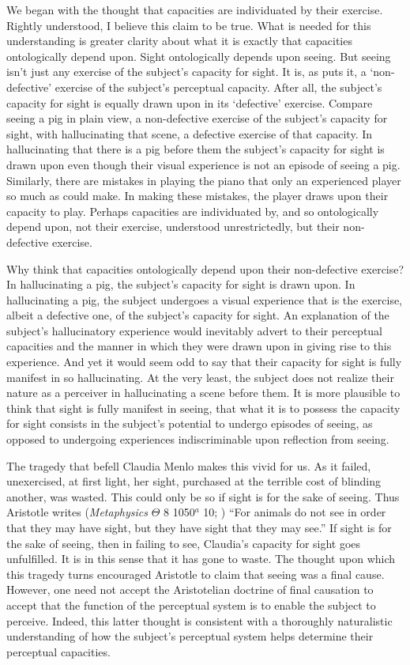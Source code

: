 \documentclass[12pt]{article}
\begin{document}
We began with the thought that capacities are individuated by their exercise. Rightly understood, I believe this claim to be true. What is needed for this understanding is greater clarity about what it is exactly that capacities ontologically depend upon. Sight ontologically depends upon seeing. But seeing isn't just any exercise of the subject's capacity for sight. It is, as \citet{McDowell:2010fk} puts it, a `non-defective' exercise of the subject's perceptual capacity. After all, the subject's capacity for sight is equally drawn upon in its `defective' exercise. Compare seeing a pig in plain view, a non-defective exercise of the subject's capacity for sight, with hallucinating that scene, a defective exercise of that capacity. In hallucinating that there is a pig before them the subject's capacity for sight is drawn upon even though their visual experience is not an episode of seeing a pig. Similarly, there are mistakes in playing the piano that only an experienced player so much as could make. In making these mistakes, the player draws upon their capacity to play. Perhaps capacities are individuated by, and so ontologically depend upon, not their exercise, understood unrestrictedly, but their non-defective exercise.

Why think that capacities ontologically depend upon their non-defective exercise? In hallucinating a pig, the subject's capacity for sight is drawn upon. In hallucinating a pig, the subject undergoes a visual experience that is the exercise, albeit a defective one, of the subject's capacity for sight. An explanation of the subject's hallucinatory experience would inevitably advert to their perceptual capacities and the manner in which they were drawn upon in giving rise to this experience. And yet it would seem odd to say that their capacity for sight is fully manifest in so hallucinating. At the very least, the subject does not realize their nature as a perceiver in hallucinating a scene before them. It is more plausible to think that sight is fully manifest in seeing, that what it is to possess the capacity for sight consists in the subject's potential to undergo episodes of seeing, as opposed to undergoing experiences indiscriminable upon reflection from seeing.

The tragedy that befell Claudia Menlo makes this vivid for us. As it failed, unexercised, at first light, her sight, purchased at the terrible cost of blinding another, was wasted. This could only be so if sight is for the sake of seeing. Thus Aristotle writes (\emph{Metaphysics} \( \Theta \) 8 1050\( ^{a} \) 10; \citealt{Barnes:1984kx}) ``For animals do not see in order that they may have sight, but they have sight that they may see.'' If sight is for the sake of seeing, then in failing to see, Claudia's capacity for sight goes unfulfilled. It is in this sense that it has gone to waste. The thought upon which this tragedy turns encouraged Aristotle to claim that seeing was a final cause. However, one need not accept the Aristotelian doctrine of final causation to accept that the function of the perceptual system is to enable the subject to perceive. Indeed, this latter thought is consistent with a thoroughly naturalistic understanding of how the subject's perceptual system helps determine their perceptual capacities.
\end{document}
